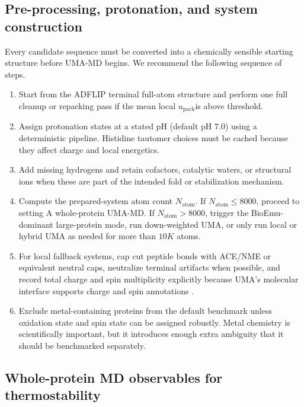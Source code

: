 \documentclass[11pt]{article}
\newcommand{\packunc}{\ensuremath{u_{\mathrm{pack}}}}
\begin{document}
	\subsection{Pre-processing, protonation, and system construction}
	
	Every candidate sequence must be converted into a chemically sensible starting structure before UMA-MD begins. We recommend the following sequence of steps.
	\begin{enumerate}[leftmargin=1.5em]
		\item Start from the ADFLIP terminal full-atom structure and perform one full cleanup or repacking pass if the mean local \packunc is above threshold.
		\item Assign protonation states at a stated pH (default pH $7.0$) using a deterministic pipeline. Histidine tautomer choices must be cached because they affect charge and local energetics.
		\item Add missing hydrogens and retain cofactors, catalytic waters, or structural ions when these are part of the intended fold or stabilization mechanism.
		\item Compute the prepared-system atom count $N_{\mathrm{atom}}$. If $N_{\mathrm{atom}}\leq 8000$, proceed to setting A whole-protein UMA-MD. If $N_{\mathrm{atom}}>8000$, trigger the BioEmu-dominant large-protein mode, run down-weighted UMA, or only run local or hybrid UMA as needed for more than $10K$ atoms. 
		\item For local fallback systems, cap cut peptide bonds with ACE/NME or equivalent neutral caps, neutralize terminal artifacts when possible, and record total charge and spin multiplicity explicitly because UMA's molecular interface supports charge and spin annotations \citep{fairchem2025github}.
		\item Exclude metal-containing proteins from the default benchmark unless oxidation state and spin state can be assigned robustly. Metal chemistry is scientifically important, but it introduces enough extra ambiguity that it should be benchmarked separately.
	\end{enumerate}
	
	\subsection{Whole-protein MD observables for thermostability}
	
\end{document}
